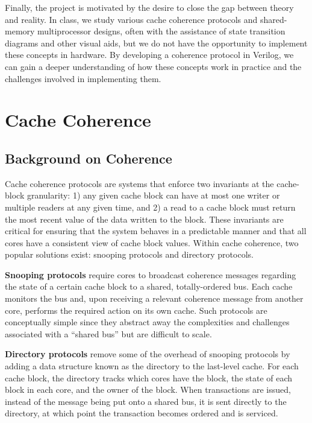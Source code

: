 \documentclass[10pt, compsoc]{IEEEtran}
\begin{document}
Finally, the project is motivated by the desire to close the gap between theory and reality. In class, we study various cache coherence protocols and shared-memory multiprocessor designs, often with the assistance of state transition diagrams and other visual aids, but we do not have the opportunity to implement these concepts in hardware. By developing a coherence protocol in  Verilog, we can gain a deeper understanding of how these concepts work in practice and the challenges involved in implementing them.





\section{Cache Coherence}\label{sec:Coherence}

\subsection{Background on Coherence}

Cache coherence protocols are systems that enforce two invariants at the cache-block granularity: 1) any given cache block can have at most one writer or multiple readers at any given time, and 2) a read to a cache block must return the most recent value of the data written to the block. These invariants are critical for ensuring that the system behaves in a predictable manner and that all cores have a consistent view of cache block values. Within cache coherence, two popular solutions exist: snooping protocols and directory protocols. 



\textbf{Snooping protocols} require cores to broadcast coherence messages regarding the state of a certain cache block to a shared, totally-ordered bus. Each cache monitors the bus and, upon receiving a relevant coherence message from another core, performs the required action on its own cache. Such protocols are conceptually simple since they abstract away the complexities and challenges associated with a ``shared bus'' but are difficult to scale. 



\textbf{Directory protocols} remove some of the overhead of snooping protocols by adding a data structure known as the directory to the last-level cache. For each cache block, the directory tracks which cores have the block, the state of each block in each core, and the owner of the block. When transactions are issued, instead of the message being put onto a shared bus, it is sent directly to the directory, at which point the transaction becomes ordered and is serviced. 
\end{document}
